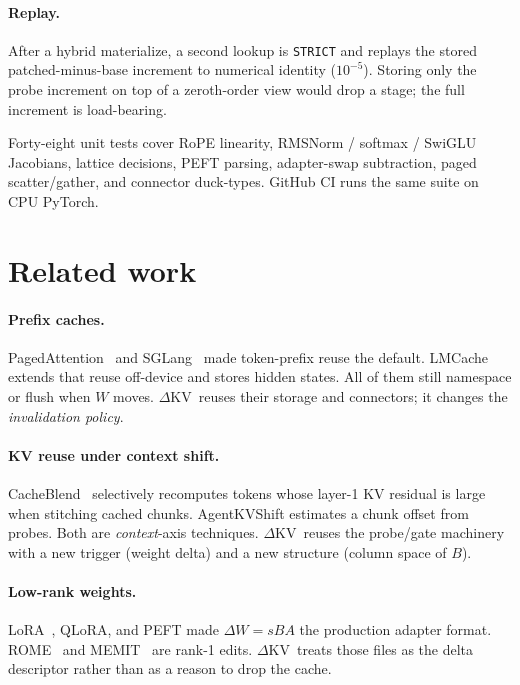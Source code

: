 \documentclass{article}
\newcommand{\dkv}{$\Delta$KV}
\begin{document}
\paragraph{Replay.}
After a hybrid materialize, a second lookup is \texttt{STRICT} and
replays the stored patched-minus-base increment to numerical identity
($10^{-5}$).
Storing only the probe increment on top of a zeroth-order view would
drop a stage; the full increment is load-bearing.

Forty-eight unit tests cover RoPE linearity, RMSNorm / softmax /
SwiGLU Jacobians, lattice decisions, PEFT parsing, adapter-swap
subtraction, paged scatter/gather, and connector duck-types.
GitHub CI runs the same suite on CPU PyTorch.

\section{Related work}
\label{sec:related}

\paragraph{Prefix caches.}
PagedAttention~\citep{kwon2023vllm} and SGLang~\citep{zheng2024sglang}
made token-prefix reuse the default.
LMCache~\citep{lmcache} extends that reuse off-device and stores hidden
states.
All of them still namespace or flush when $W$ moves.
\dkv\ reuses their storage and connectors; it changes the
\emph{invalidation policy}.

\paragraph{KV reuse under context shift.}
CacheBlend~\citep{yao2024cacheblend} selectively recomputes tokens whose
layer-1 KV residual is large when stitching cached chunks.
AgentKVShift estimates a chunk offset from probes.
Both are \emph{context}-axis techniques.
\dkv\ reuses the probe/gate machinery with a new trigger (weight delta)
and a new structure (column space of $B$).

\paragraph{Low-rank weights.}
LoRA~\citep{hu2022lora}, QLoRA, and PEFT made $\Delta W=sBA$ the
production adapter format.
ROME~\citep{meng2022rome} and MEMIT~\citep{meng2023memit} are rank-1
edits.
\dkv\ treats those files as the delta descriptor rather than as a reason
to drop the cache.
\end{document}

